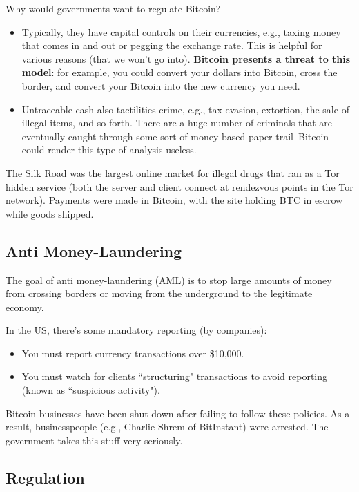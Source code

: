 \documentclass[12pt]{article}
\begin{document}
Why would governments want to regulate Bitcoin?
\begin{itemize}
\item Typically, they have capital controls on their currencies, e.g., taxing money that comes in and out or pegging the exchange rate. This is helpful for various reasons (that we won't go into). \textbf{Bitcoin presents a threat to this model}: for example, you could convert your dollars into Bitcoin, cross the border, and convert your Bitcoin into the new currency you need.
\item Untraceable cash also tactilities crime, e.g., tax evasion, extortion, the sale of illegal items, and so forth. There are a huge number of criminals that are eventually caught through some sort of money-based paper trail--Bitcoin could render this type of analysis useless.
\end{itemize}

The Silk Road was the largest online market for illegal drugs that ran as a Tor hidden service (both the server and client connect at rendezvous points in the Tor network). Payments were made in Bitcoin, with the site holding BTC in escrow while goods shipped.

\subsection*{Anti Money-Laundering}

The goal of anti money-laundering (AML) is to stop large amounts of money from crossing borders or moving from the underground to the legitimate economy.

In the US, there's some mandatory reporting (by companies):
\begin{itemize}
\item You must report currency transactions over \$10,000.
\item You must watch for clients ``structuring" transactions to avoid reporting (known as ``suspicious activity").
\end{itemize}

Bitcoin businesses have been shut down after failing to follow these policies. As a result, businesspeople (e.g., Charlie Shrem of BitInstant) were arrested. The government takes this stuff very seriously.

\subsection*{Regulation}
\end{document}
